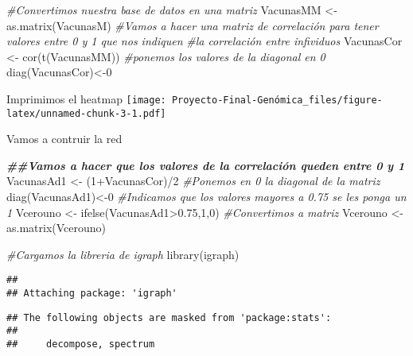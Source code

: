 \documentclass[
]{article}
\newenvironment{Shaded}{\begin{snugshade}}{\end{snugshade}}
\newcommand{\CommentTok}[1]{\textcolor[rgb]{0.56,0.35,0.01}{\textit{#1}}}
\newcommand{\DecValTok}[1]{\textcolor[rgb]{0.00,0.00,0.81}{#1}}
\newcommand{\DocumentationTok}[1]{\textcolor[rgb]{0.56,0.35,0.01}{\textbf{\textit{#1}}}}
\newcommand{\FloatTok}[1]{\textcolor[rgb]{0.00,0.00,0.81}{#1}}
\newcommand{\FunctionTok}[1]{\textcolor[rgb]{0.00,0.00,0.00}{#1}}
\newcommand{\NormalTok}[1]{#1}
\newcommand{\OtherTok}[1]{\textcolor[rgb]{0.56,0.35,0.01}{#1}}
\newcommand{\SpecialCharTok}[1]{\textcolor[rgb]{0.00,0.00,0.00}{#1}}
\begin{document}
\begin{Shaded}
\begin{Highlighting}[]
\CommentTok{\#Convertimos nuestra base de datos en una matriz}
\NormalTok{VacunasMM }\OtherTok{\textless{}{-}} \FunctionTok{as.matrix}\NormalTok{(VacunasM)}
\CommentTok{\#Vamos a hacer una matriz de correlación para tener valores entre 0 y 1 que nos indiquen }
\CommentTok{\#la correlación entre infividuos}
\NormalTok{VacunasCor }\OtherTok{\textless{}{-}} \FunctionTok{cor}\NormalTok{(}\FunctionTok{t}\NormalTok{(VacunasMM))}
\CommentTok{\#ponemos los valores de la diagonal en 0}
\FunctionTok{diag}\NormalTok{(VacunasCor)}\OtherTok{\textless{}{-}}\DecValTok{0}
\end{Highlighting}
\end{Shaded}

Imprimimos el heatmap
\texttt{[image: Proyecto-Final-Genómica\_files/figure-latex/unnamed-chunk-3-1.pdf]}

Vamos a contruir la red

\begin{Shaded}
\begin{Highlighting}[]
\DocumentationTok{\#\#Vamos a hacer que los valores de la correlación queden entre 0 y 1}
\NormalTok{VacunasAd1 }\OtherTok{\textless{}{-}}\NormalTok{ (}\DecValTok{1}\SpecialCharTok{+}\NormalTok{VacunasCor)}\SpecialCharTok{/}\DecValTok{2}
\CommentTok{\#Ponemos en 0 la diagonal de la matriz}
\FunctionTok{diag}\NormalTok{(VacunasAd1)}\OtherTok{\textless{}{-}}\DecValTok{0}
\CommentTok{\#Indicamos que los valores mayores a 0.75 se les ponga un 1}
\NormalTok{Vcerouno }\OtherTok{\textless{}{-}} \FunctionTok{ifelse}\NormalTok{(VacunasAd1}\SpecialCharTok{\textgreater{}}\FloatTok{0.75}\NormalTok{,}\DecValTok{1}\NormalTok{,}\DecValTok{0}\NormalTok{)}
\CommentTok{\#Convertimos a matriz}
\NormalTok{Vcerouno }\OtherTok{\textless{}{-}} \FunctionTok{as.matrix}\NormalTok{(Vcerouno)}

\CommentTok{\#Cargamos la libreria de igraph}
\FunctionTok{library}\NormalTok{(igraph)}
\end{Highlighting}
\end{Shaded}

\begin{verbatim}
## 
## Attaching package: 'igraph'
\end{verbatim}

\begin{verbatim}
## The following objects are masked from 'package:stats':
## 
##     decompose, spectrum
\end{verbatim}
\end{document}
